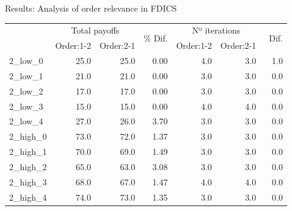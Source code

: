 \documentclass[aspectratio=169]{beamer}
\begin{document}
\begin{frame}{Results: Analysis of order relevance in FDICS}

\begin{table}[ht!]
\centering
\begin{adjustbox}{max width=\textwidth}
\begin{tabular}{lrrrrrr}
\toprule
{} & \multicolumn{2}{c}{Total payoffs} & \multirow{2}{*}{\% Dif.} & \multicolumn{2}{c}{Nº iterations} & \multirow{2}{*}{\ Dif.} \\
{} &  Order:1-2 &  Order:2-1 &       &  Order:1-2 &  Order:2-1 & \\
\midrule
2\_low\_0  &           25.0 &           25.0 &  0.00 &        4.0 &        3.0 &     1.0 \\
2\_low\_1  &           21.0 &           21.0 &  0.00 &        3.0 &        3.0 &     0.0 \\
2\_low\_2  &           17.0 &           17.0 &  0.00 &        3.0 &        3.0 &     0.0 \\
2\_low\_3  &           15.0 &           15.0 &  0.00 &        4.0 &        4.0 &     0.0 \\
2\_low\_4  &           27.0 &           26.0 &  3.70 &        3.0 &        3.0 &     0.0 \\
2\_high\_0 &           73.0 &           72.0 &  1.37 &        3.0 &        3.0 &     0.0 \\
2\_high\_1 &           70.0 &           69.0 &  1.49 &        3.0 &        3.0 &     0.0 \\
2\_high\_2 &           65.0 &           63.0 &  3.08 &        3.0 &        3.0 &     0.0 \\
2\_high\_3 &           68.0 &           67.0 &  1.47 &        4.0 &        4.0 &     0.0 \\
2\_high\_4 &           74.0 &           73.0 &  1.35 &        3.0 &        3.0 &     0.0 \\
\bottomrule
\end{tabular}
\end{adjustbox}
\end{table}
\end{frame}
\end{document}
